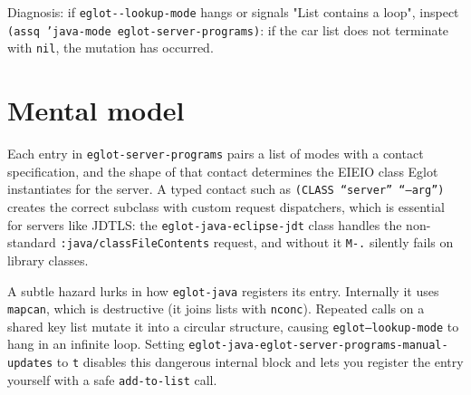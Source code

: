Diagnosis: if \texttt{eglot-\/-lookup-mode} hangs or signals "List contains a loop", inspect \texttt{(assq 'java-mode eglot-server-programs)}: if the car list does not terminate with \texttt{nil}, the mutation has occurred.

\section{Mental model}
Each entry in \texttt{eglot-server-programs} pairs a list of modes with a contact specification, and the shape of that contact determines the EIEIO class Eglot instantiates for the server.  A typed contact such as \texttt{(CLASS ``server'' ``--arg'')} creates the correct subclass with custom request dispatchers, which is essential for servers like JDTLS: the \texttt{eglot-java-eclipse-jdt} class handles the non-standard \texttt{:java/classFileContents} request, and without it \texttt{M-.} silently fails on library classes.

A subtle hazard lurks in how \texttt{eglot-java} registers its entry.  Internally it uses \texttt{mapcan}, which is destructive (it joins lists with \texttt{nconc}).  Repeated calls on a shared key list mutate it into a circular structure, causing \texttt{eglot--lookup-mode} to hang in an infinite loop.  Setting \texttt{eglot-java-eglot-server-programs-manual-updates} to \texttt{t} disables this dangerous internal block and lets you register the entry yourself with a safe \texttt{add-to-list} call.
